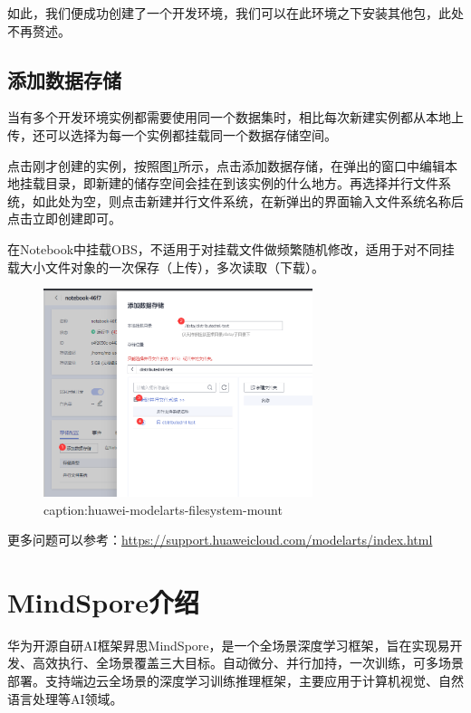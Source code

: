 如此，我们便成功创建了一个开发环境，我们可以在此环境之下安装其他包，此处不再赘述。

\subsection{添加数据存储}

当有多个开发环境实例都需要使用同一个数据集时，相比每次新建实例都从本地上传，还可以选择为每一个实例都挂载同一个数据存储空间。

点击刚才创建的实例，按照图\ref{fig:huawei-modelarts-filesystem-mount}所示，点击添加数据存储，在弹出的窗口中编辑本地挂载目录，即新建的储存空间会挂在到该实例的什么地方。再选择并行文件系统，如此处为空，则点击新建并行文件系统，在新弹出的界面输入文件系统名称后点击立即创建即可。

在Notebook中挂载OBS，不适用于对挂载文件做频繁随机修改，适用于对不同挂载大小文件对象的一次保存（上传），多次读取（下载）。

\begin{figure}[htbp]
	\centering
	\includegraphics[width=0.7\textwidth]{figures/huawei-modelarts-filesystem-mount.png}
	\caption{caption:huawei-modelarts-filesystem-mount}
	\label{fig:huawei-modelarts-filesystem-mount}
\end{figure}

\vspace{3em}
更多问题可以参考：\url{https://support.huaweicloud.com/modelarts/index.html}

\section{MindSpore介绍}

华为开源自研AI框架{昇}思MindSpore，是一个全场景深度学习框架，旨在实现易开发、高效执行、全场景覆盖三大目标。自动微分、并行加持，一次训练，可多场景部署。支持端边云全场景的深度学习训练推理框架，主要应用于计算机视觉、自然语言处理等AI领域。

